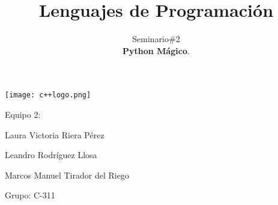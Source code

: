 \documentclass[10pt]{article}
\title{\textbf{Lenguajes de Programaci\'on}}
\author{Seminario\#2\\
 \textbf{Python M\'agico}.}
\date{}
\begin{document}
	\begin{titlepage}
		\clearpage	
		\maketitle
		\begin{center}
			\texttt{[image: c++logo.png]}
			
			\vspace{5em}
			Equipo 2:
			
			Laura Victoria Riera P\'erez
			
			Leandro Rodr\'iguez Llosa
			
			Marcos Manuel Tirador del Riego
			\vspace{1em}
			
			Grupo: C-311
		\end{center}
		\thispagestyle{empty}
	\end{titlepage}


\newpage
{}
\tableofcontents
\thispagestyle{empty}

\newpage
{}

% 

% 

% 

% 

% 

% 
\end{document}
